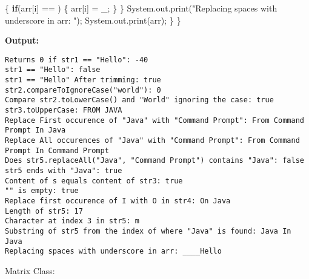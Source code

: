 \documentclass[
  12pt,
]{article}
\newenvironment{Shaded}{}{}
\newcommand{\BuiltInTok}[1]{\textcolor[rgb]{0.00,0.50,0.00}{#1}}
\newcommand{\CharTok}[1]{\textcolor[rgb]{0.25,0.44,0.63}{#1}}
\newcommand{\ControlFlowTok}[1]{\textcolor[rgb]{0.00,0.44,0.13}{\textbf{#1}}}
\newcommand{\FunctionTok}[1]{\textcolor[rgb]{0.02,0.16,0.49}{#1}}
\newcommand{\NormalTok}[1]{#1}
\newcommand{\OperatorTok}[1]{\textcolor[rgb]{0.40,0.40,0.40}{#1}}
\newcommand{\StringTok}[1]{\textcolor[rgb]{0.25,0.44,0.63}{#1}}
\begin{document}
\begin{Shaded}
\begin{Highlighting}[numbers=left,,]
        \OperatorTok{\{}
            \ControlFlowTok{if}\OperatorTok{(}\NormalTok{arr}\OperatorTok{[}\NormalTok{i}\OperatorTok{]} \OperatorTok{==} \CharTok{\textquotesingle{} \textquotesingle{}}\OperatorTok{)}
            \OperatorTok{\{}
\NormalTok{                arr}\OperatorTok{[}\NormalTok{i}\OperatorTok{]} \OperatorTok{=} \CharTok{\textquotesingle{}\_\textquotesingle{}}\OperatorTok{;}
            \OperatorTok{\}}
        \OperatorTok{\}}
        \BuiltInTok{System}\OperatorTok{.}\FunctionTok{out}\OperatorTok{.}\FunctionTok{print}\OperatorTok{(}\StringTok{"Replacing spaces with underscore in arr: "}\OperatorTok{);}
        \BuiltInTok{System}\OperatorTok{.}\FunctionTok{out}\OperatorTok{.}\FunctionTok{print}\OperatorTok{(}\NormalTok{arr}\OperatorTok{);}
    \OperatorTok{\}}
\OperatorTok{\}}
\end{Highlighting}
\end{Shaded}

\textbf{Output:}

\begin{verbatim}
Returns 0 if str1 == "Hello": -40
str1 == "Hello": false
str1 == "Hello" After trimming: true
str2.compareToIgnoreCase("world"): 0
Compare str2.toLowerCase() and "World" ignoring the case: true
str3.toUpperCase: FROM JAVA
Replace First occurence of "Java" with "Command Prompt": From Command Prompt In Java
Replace All occurences of "Java" with "Command Prompt": From Command Prompt In Command Prompt
Does str5.replaceAll("Java", "Command Prompt") contains "Java": false
str5 ends with "Java": true
Content of s equals content of str3: true
"" is empty: true
Replace first occurence of I with O in str4: On Java
Length of str5: 17
Character at index 3 in str5: m
Substring of str5 from the index of where "Java" is found: Java In Java
Replacing spaces with underscore in arr: ____Hello
\end{verbatim}

Matrix Class:
\end{document}
